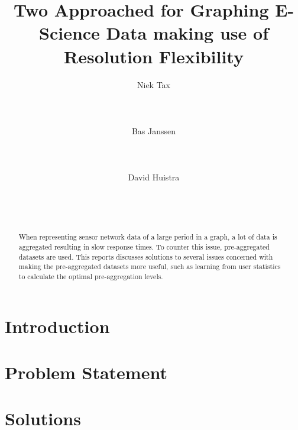 \documentclass{sig-alternate-br}
\begin{document}

\title{Two Approached for Graphing E-Science Data making use of Resolution Flexibility}

\author{
\alignauthor Niek Tax\\
       \\
       \\
       \\
\alignauthor Bas Janssen\\
       \\
       \\
       \\
\alignauthor David Huistra\\
              \\
              \\
              \\
}

\maketitle
\begin{abstract}
When representing sensor network data of a large period in a graph, a lot of data is aggregated resulting in slow response times. To counter this issue, pre-aggregated
datasets are used. This reports discusses solutions to several issues concerned with making the pre-aggregated datasets more useful, such as learning from user statistics to calculate the optimal pre-aggregation levels.
\end{abstract} 


\section{Introduction}

\section{Problem Statement}

\section{Solutions}

%




\balancecolumns

\onecolumn
\end{document}
